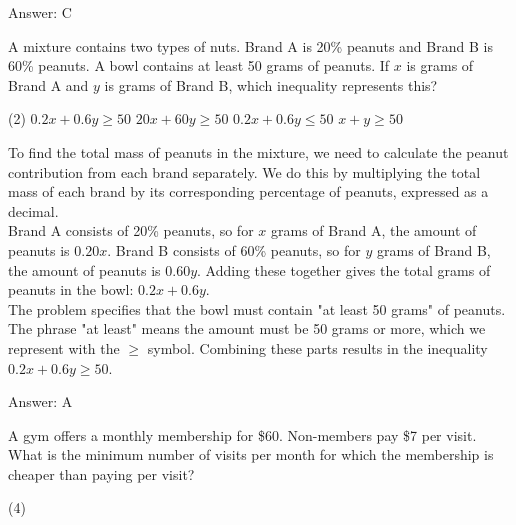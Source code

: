 \documentclass[11pt,paper=a4,answers]{exam}
\begin{document}
\begin{questions}
\begin{solution}
\vspace{15pt}
Answer: \colorbox{yellow!100}{C}
\end{solution}

\question
A mixture contains two types of nuts. Brand A is 20\% peanuts and Brand B is 60\% peanuts. A bowl contains at least 50 grams of peanuts. If $x$ is grams of Brand A and $y$ is grams of Brand B, which inequality represents this?
\begin{tasks}(2)
    \task $0.2x + 0.6y \geq 50$
    \task $20x + 60y \geq 50$
    \task $0.2x + 0.6y \leq 50$
    \task $x + y \geq 50$
\end{tasks}

\begin{solution}
To find the total mass of peanuts in the mixture, we need to calculate the peanut contribution from each brand separately. We do this by multiplying the total mass of each brand by its corresponding percentage of peanuts, expressed as a decimal.
\\[10pt]
Brand A consists of 20\% peanuts, so for $x$ grams of Brand A, the amount of peanuts is $0.20x$. Brand B consists of 60\% peanuts, so for $y$ grams of Brand B, the amount of peanuts is $0.60y$. Adding these together gives the total grams of peanuts in the bowl: $0.2x + 0.6y$.
\\[10pt]
The problem specifies that the bowl must contain "at least 50 grams" of peanuts. The phrase "at least" means the amount must be 50 grams or more, which we represent with the $\geq$ symbol. Combining these parts results in the inequality $0.2x + 0.6y \geq 50$.

\vspace{15pt}
Answer: \colorbox{yellow!100}{A}
\end{solution}

\question
A gym offers a monthly membership for \$60. Non-members pay \$7 per visit. What is the minimum number of visits per month for which the membership is cheaper than paying per visit?
\begin{tasks}(4)
\end{tasks}


\end{questions}
\end{document}
